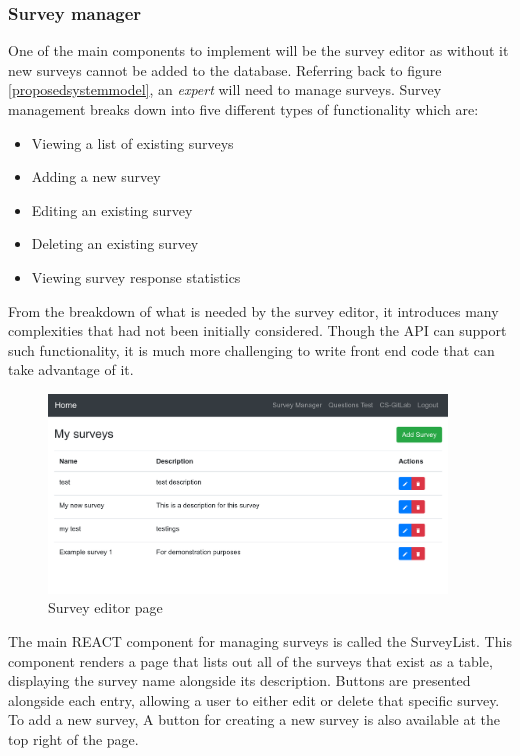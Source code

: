 \subsubsection{Survey manager}
One of the main components to implement will be the survey editor as without it new surveys cannot be added to the database.
Referring back to figure \ref{proposedsystemmodel}, an \textit{expert} will need to manage surveys.
Survey management breaks down into five different types of functionality which are:

\begin{itemize}
    \tightlist
    \item Viewing a list of existing surveys 
    \item Adding a new survey
    \item Editing an existing survey
    \item Deleting an existing survey
    \item Viewing survey response statistics
\end{itemize}

From the breakdown of what is needed by the survey editor, it introduces many complexities that had not been initially considered.
Though the API can support such functionality, it is much more challenging to write front end code that can take advantage of it.


\begin{figure}[ht]
    \centering
    \includegraphics[width=400px]{images/survey_manager_screen.png}
    \caption{Survey editor page}
    \label{surveyeditorpage}
\end{figure}

The main REACT component for managing surveys is called the SurveyList.
This component renders a page that lists out all of the surveys that exist as a table, displaying the survey name alongside its 
description.
Buttons are presented alongside each entry, allowing a user to either edit or delete that specific survey.
To add a new survey, 
A button for creating a new survey is also available at the top right of the page.


